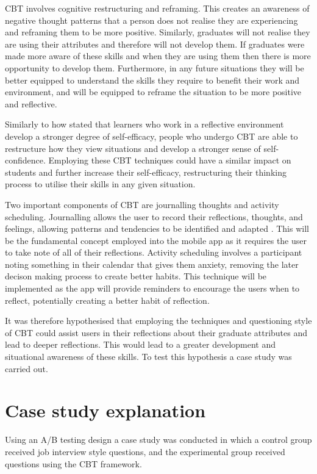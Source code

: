 \documentclass{l4proj}
\begin{document}
CBT involves cognitive restructuring and reframing. This creates an awareness of negative thought patterns that a person does not realise they are experiencing and reframing them to be more positive. Similarly, graduates will not realise they are using their attributes and therefore will not develop them. If graduates were made more aware of these skills and when they are using them then there is more opportunity to develop them. Furthermore, in any future situations they will be better equipped to understand the skills they require to benefit their work and environment, and will be equipped to reframe the situation to be more positive and reflective.

Similarly to how \citet{bruno_reflective_2018} stated that learners who work in a reflective environment develop a stronger degree of self-efficacy, people who undergo CBT are able to restructure how they view situations and develop a stronger sense of self-confidence. Employing these CBT techniques could have a similar impact on students and further increase their self-efficacy, restructuring their thinking process to utilise their skills in any given situation. 

Two important components of CBT are journalling thoughts and activity scheduling. Journalling allows the user to record their reflections, thoughts, and feelings, allowing patterns and tendencies to be identified and adapted \citep{ackerman_cbt_2017}. This will be the fundamental concept employed into the mobile app as it requires the user to take note of all of their reflections. Activity scheduling involves a participant noting something in their calendar that gives them anxiety, removing the later decison making process to create better habits. This technique will be implemented as the app will provide reminders to encourage the users when to reflect, potentially creating a better habit of reflection.

It was therefore hypothesised that employing the techniques and questioning style of CBT could assist users in their reflections about their graduate attributes and lead to deeper reflections. This would lead to a greater development and situational awareness of these skills. To test this hypothesis a case study was carried out.

\section{Case study explanation}

Using an A/B testing design a case study was conducted in which a control group received job interview style questions, and the experimental group received questions using the CBT framework. 
\end{document}
